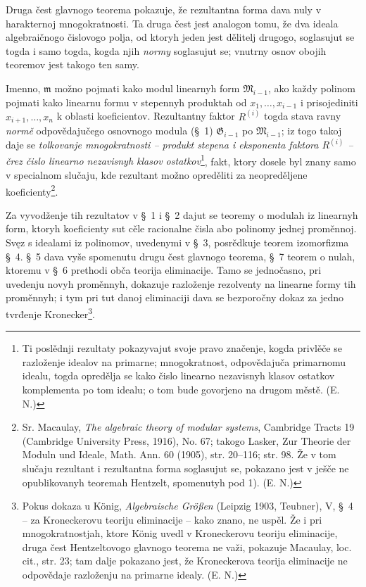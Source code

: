 \documentclass[11pt]{article}
\providecommand{\Gmod}{\mathfrak G}
\providecommand{\mideal}{\mathfrak m}
\begin{document}
Druga čest glavnogo teorema pokazuje, že rezultantna forma dava nuly v harakternoj mnogokratnosti. Ta druga čest jest analogon tomu, že dva ideala algebraičnogo čislovogo polja, od ktoryh jeden jest dělitelj drugogo, soglasujut se togda i samo togda, kogda njih \emph{normy} soglasujut se; vnutrny osnov obojih teoremov jest takogo ten samy.

Imenno, $\mideal$ možno pojmati kako modul linearnyh form $\mathfrak M_{i-1}$, ako každy polinom pojmati kako linearnu formu v stepennyh produktah od $x_1,\ldots,x_{i-1}$ i prisojediniti $x_{i+1},\ldots,x_n$ k oblasti koeficientov. Rezultantny faktor $R^{(i)}$ togda stava ravny \emph{normě} odpovědajučego osnovnogo modula (§~1) $\Gmod_{i-1}$ po $\mathfrak M_{i-1}$; iz togo takoj daje se \emph{tolkovanje mnogokratnosti -- produkt stepena i eksponenta faktora $R^{(i)}$ -- črez čislo linearno nezavisnyh klasov ostatkov}\footnote{Ti poslědnji rezultaty pokazyvajut svoje pravo značenje, kogda privlěče se razloženje idealov na primarne; mnogokratnost, odpovědajuča primarnomu idealu, togda opredělja se kako čislo linearno nezavisnyh klasov ostatkov komplementa po tom idealu; o tom bude govorjeno na drugom městě. (E. N.)}, fakt, ktory dosele byl znany samo v specialnom slučaju, kde rezultant možno opreděliti za neopreděljene koeficienty\footnote{Sr. Macaulay, \emph{The algebraic theory of modular systems}, Cambridge Tracts 19 (Cambridge University Press, 1916), No. 67; takogo Lasker, Zur Theorie der Moduln und Ideale, Math. Ann. 60 (1905), str. 20--116; str. 98. Že v tom slučaju rezultant i rezultantna forma soglasujut se, pokazano jest v ješče ne opublikovanyh teoremah Hentzelt, spomenutyh pod 1). (E. N.)}.

Za vyvodženje tih rezultatov v §~1 i §~2 dajut se teoremy o modulah iz linearnyh form, ktoryh koeficienty sut cěle racionalne čisla abo polinomy jednej proměnnoj. Svęz s idealami iz polinomov, uvedenymi v §~3, posrědkuje teorem izomorfizma §~4. §~5 dava vyše spomenutu drugu čest glavnogo teorema, §~7 teorem o nulah, ktoremu v §~6 prethodi obča teorija eliminacije. Tamo se jednočasno, pri uvedenju novyh proměnnyh, dokazuje razloženje rezolventy na linearne formy tih proměnnyh; i tym pri tut danoj eliminaciji dava se bezporočny dokaz za jedno tvrđenje Kronecker\footnote{Pokus dokaza u König, \emph{Algebraische Größen} (Leipzig 1903, Teubner), V, §~4 -- za Kroneckerovu teoriju eliminacije -- kako znano, ne uspěl. Že i pri mnogokratnostjah, ktore König uvedl v Kroneckerovu teoriju eliminacije, druga čest Hentzeltovogo glavnogo teorema ne važi, pokazuje Macaulay, loc. cit., str. 23; tam dalje pokazano jest, že Kroneckerova teorija eliminacije ne odpovědaje razloženju na primarne idealy. (E. N.)}.
\end{document}
